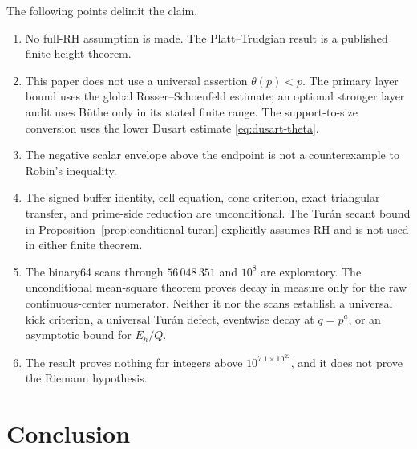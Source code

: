 \documentclass[11pt,a4paper]{article}
\numberwithin{equation}{section}
\theoremstyle{definition}
\newcommand{\Xdirect}{56\,048\,351}
\begin{document}
The following points delimit the claim.
\begin{enumerate}
  \item No full-RH assumption is made.  The Platt--Trudgian result is a
        published finite-height theorem.
  \item This paper does not use a universal assertion
        \(\theta(p)<p\).  The primary layer bound uses the global
        Rosser--Schoenfeld estimate; an optional stronger layer audit uses
        B\"uthe only in its stated finite range.  The support-to-size
        conversion uses the lower Dusart estimate
        \eqref{eq:dusart-theta}.
  \item The negative scalar envelope above the endpoint is not a
        counterexample to Robin's inequality.
  \item The signed buffer identity, cell equation, cone criterion, exact
        triangular transfer, and prime-side reduction are unconditional.
        The Tur\'an secant bound in
        Proposition~\ref{prop:conditional-turan} explicitly assumes RH and is
        not used in either finite theorem.
  \item The binary64 scans through \(\Xdirect\) and \(10^8\) are exploratory.
        The unconditional mean-square theorem proves decay in measure only
        for the raw continuous-center numerator.  Neither it nor the scans
        establish a universal kick criterion, a universal Tur\'an defect,
        eventwise decay at \(q=p^a\), or an asymptotic bound for \(E_h/Q\).
  \item The result proves nothing for integers above
        \(10^{7.1\times10^{22}}\), and it does not prove the Riemann
        hypothesis.
\end{enumerate}

\section{Conclusion}
\end{document}
